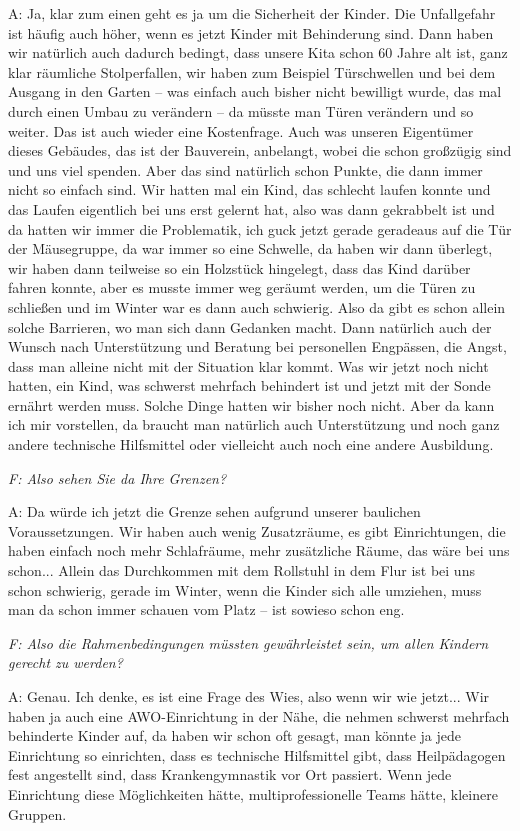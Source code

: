 \begin{linenumbers*}
A: Ja, klar zum einen geht es ja um die Sicherheit der Kinder. Die Unfallgefahr ist häufig auch höher, wenn es jetzt Kinder mit Behinderung sind. Dann haben wir natürlich auch dadurch bedingt, dass unsere Kita schon 60 Jahre alt ist, ganz klar räumliche Stolperfallen, wir haben zum Beispiel Türschwellen und bei dem Ausgang in den Garten -- was einfach auch bisher nicht bewilligt wurde, das mal durch einen Umbau zu verändern -- da müsste man Türen verändern und so weiter. Das ist auch wieder eine Kostenfrage. Auch was unseren Eigentümer dieses Gebäudes, das ist der Bauverein, anbelangt, wobei die schon großzügig sind und uns viel spenden. Aber das sind natürlich schon Punkte, die dann immer nicht so einfach sind. Wir hatten mal ein Kind, das schlecht laufen konnte und das Laufen eigentlich bei uns erst gelernt hat, also was dann gekrabbelt ist und da hatten wir immer die Problematik, ich guck jetzt gerade geradeaus auf die Tür der Mäusegruppe, da war immer so eine Schwelle, da haben wir dann überlegt, wir haben dann teilweise so ein Holzstück hingelegt, dass das Kind darüber fahren konnte, aber es musste immer weg geräumt werden, um die Türen zu schließen und im Winter war es dann auch schwierig. Also da gibt es schon allein solche Barrieren, wo man sich dann Gedanken macht. Dann natürlich auch der Wunsch nach Unterstützung und Beratung bei personellen Engpässen, die Angst, dass man alleine nicht mit der Situation klar kommt. Was wir jetzt noch nicht hatten, ein Kind, was schwerst mehrfach behindert ist und jetzt mit der Sonde ernährt werden muss. Solche Dinge hatten wir bisher noch nicht. Aber da kann ich mir vorstellen, da braucht man natürlich auch Unterstützung und noch ganz andere technische Hilfsmittel oder vielleicht auch noch eine andere Ausbildung. 

\emph{F: Also sehen Sie da Ihre Grenzen?}

A: Da würde ich jetzt die Grenze sehen aufgrund unserer baulichen Voraussetzungen. Wir haben auch wenig Zusatzräume, es gibt Einrichtungen, die haben einfach noch mehr Schlafräume, mehr zusätzliche Räume, das wäre bei uns schon... Allein das Durchkommen mit dem Rollstuhl in dem Flur ist bei uns schon schwierig, gerade im Winter, wenn die Kinder sich alle umziehen, muss man da schon immer schauen vom Platz -- ist sowieso schon eng. 

\emph{F: Also die Rahmenbedingungen müssten gewährleistet sein, um allen Kindern gerecht zu werden?}

A: Genau. Ich denke, es ist eine Frage des Wies, also wenn wir wie jetzt... Wir haben ja auch eine AWO-Einrichtung in der Nähe, die nehmen schwerst mehrfach behinderte Kinder auf, da haben wir schon oft gesagt, man könnte ja jede Einrichtung so einrichten, dass es technische Hilfsmittel gibt, dass Heilpädagogen fest angestellt sind, dass Krankengymnastik vor Ort passiert. Wenn jede Einrichtung diese Möglichkeiten hätte, multiprofessionelle Teams hätte, kleinere Gruppen. 


\end{linenumbers*}
